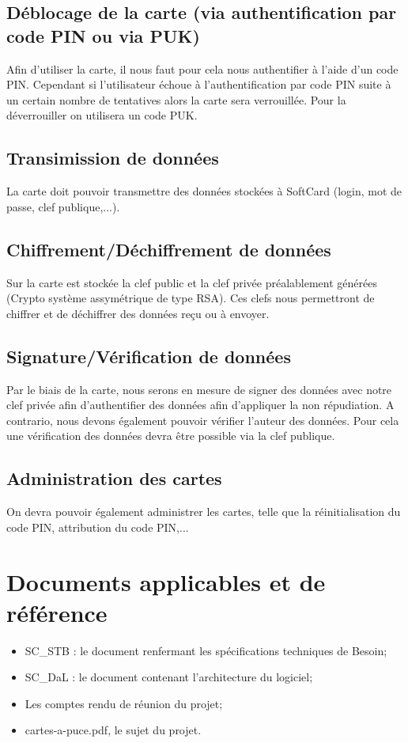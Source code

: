 \documentclass[a4paper,11pt,french]{article}
\begin{document}
\subsection*{Déblocage de la carte (via authentification par code PIN ou via PUK)}
Afin d'utiliser la carte, il nous faut pour cela nous authentifier à l'aide d'un code PIN. Cependant si l'utilisateur échoue à l'authentification par code PIN suite à un certain nombre de tentatives alors la carte sera verrouillée. Pour la déverrouiller on utilisera un code PUK.

\subsection*{Transimission de données}
La carte doit pouvoir transmettre des données stockées à SoftCard (login, mot de passe, clef publique,...).

\subsection*{Chiffrement/Déchiffrement de données}
Sur la carte est stockée la clef public et la clef privée préalablement générées (Crypto système assymétrique de type RSA). Ces clefs nous permettront de chiffrer et de déchiffrer des données reçu ou à envoyer.

\subsection*{Signature/Vérification de données}
Par le biais de la carte, nous serons en mesure de signer des données avec notre clef privée afin d'authentifier des données afin d'appliquer la non répudiation. A contrario, nous devons également pouvoir vérifier l'auteur des données. Pour cela une vérification des données devra être possible via la clef publique. 

\subsection*{Administration des cartes}
On devra pouvoir également administrer les cartes, telle que la réinitialisation du code PIN, attribution du code PIN,...


\section{Documents applicables et de référence}
\begin{itemize}
	\item SC\_STB : le document renfermant les spécifications techniques de Besoin;
	\item SC\_DaL : le document contenant l'architecture du logiciel;
	\item Les comptes rendu de réunion du projet;
	\item cartes-a-puce.pdf, le sujet du projet.
\end{itemize}
\end{document}
